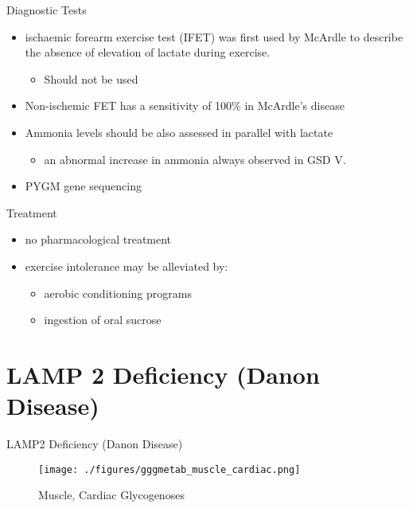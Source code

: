 \documentclass[presentation, smaller]{beamer}
\begin{document}
\begin{frame}[label={sec:orga5c2b2e}]{Diagnostic Tests}
\begin{itemize}
\item ischaemic forearm exercise test (IFET) was first used by McArdle to
describe the absence of elevation of lactate during exercise.
\begin{itemize}
\item \alert{Should not be used}
\end{itemize}

\item Non-ischemic FET has a sensitivity of 100\% in McArdle’s disease
\item Ammonia levels should be also assessed in parallel with lactate
\begin{itemize}
\item an abnormal increase in ammonia always observed in GSD V.
\end{itemize}
\item PYGM gene sequencing
\end{itemize}
\end{frame}

\begin{frame}[label={sec:orgce912c1}]{Treatment}
\begin{itemize}
\item no pharmacological treatment
\item exercise intolerance may be alleviated by:
\begin{itemize}
\item aerobic conditioning programs
\item ingestion of oral sucrose
\end{itemize}
\end{itemize}
\end{frame}
\section{LAMP 2 Deficiency (Danon Disease)}
\label{sec:orge60d71e}
\begin{frame}[label={sec:org617a19c}]{LAMP2 Deficiency (Danon Disease)}
\begin{figure}[htbp]
\centering
\texttt{[image: ./figures/gggmetab\_muscle\_cardiac.png]}
\caption[Muscle, Cardiac Glycogenoses]{\label{fig:orgc542f95}
Muscle, Cardiac Glycogenoses}
\end{figure}
\end{frame}
\end{document}
